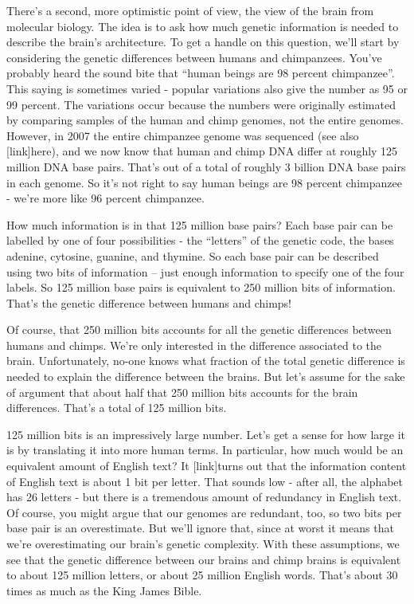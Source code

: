\documentclass[a4paper,twoside,10pt]{book}
\begin{document}
There's a second, more optimistic point of view, the view of the brain from molecular biology. The idea is to ask how much genetic information is needed to describe the brain's architecture. To get a handle on this question, we'll start by considering the genetic differences between humans and chimpanzees. You've probably heard the sound bite that ``human beings are 98 percent chimpanzee''. This saying is sometimes varied - popular variations also give the number as 95 or 99 percent. The variations occur because the numbers were originally estimated by comparing samples of the human and chimp genomes, not the entire genomes. However, in 2007 the entire chimpanzee genome was sequenced (see also [link]here), and we now know that human and chimp DNA differ at roughly 125 million DNA base pairs. That's out of a total of roughly 3 billion DNA base pairs in each genome. So it's not right to say human beings are 98 percent chimpanzee - we're more like 96 percent chimpanzee.

How much information is in that 125 million base pairs? Each base pair can be labelled by one of four possibilities - the ``letters'' of the genetic code, the bases adenine, cytosine, guanine, and thymine. So each base pair can be described using two bits of information -- just enough information to specify one of the four labels. So 125 million base pairs is equivalent to 250 million bits of information. That's the genetic difference between humans and chimps!

Of course, that 250 million bits accounts for all the genetic differences between humans and chimps. We're only interested in the difference associated to the brain. Unfortunately, no-one knows what fraction of the total genetic difference is needed to explain the difference between the brains. But let's assume for the sake of argument that about half that 250 million bits accounts for the brain differences. That's a total of 125 million bits.

125 million bits is an impressively large number. Let's get a sense for how large it is by translating it into more human terms. In particular, how much would be an equivalent amount of English text? It [link]turns out that the information content of English text is about 1 bit per letter. That sounds low - after all, the alphabet has 26 letters - but there is a tremendous amount of redundancy in English text. Of course, you might argue that our genomes are redundant, too, so two bits per base pair is an overestimate. But we'll ignore that, since at worst it means that we're overestimating our brain's genetic complexity. With these assumptions, we see that the genetic difference between our brains and chimp brains is equivalent to about 125 million letters, or about 25 million English words. That's about 30 times as much as the King James Bible.
\end{document}
